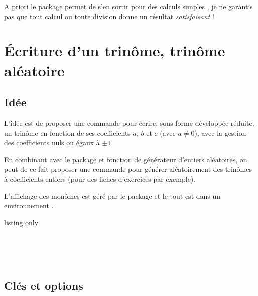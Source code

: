 \begin{noteblock}
A priori le package  permet de s'en sortir pour des calculs \og simples \fg, je ne garantis pas que tout calcul ou toute division donne un résultat \textit{satisfaisant} !
\end{noteblock}

\newpage

\section{Écriture d'un trinôme, trinôme aléatoire}\label{trinome}

\subsection{Idée}

\begin{tipblock}
L'idée est de proposer une commande pour écrire, sous forme développée réduite, un trinôme en fonction de ses coefficients $a$, $b$ et $c$ (avec $a\neq0$), avec la gestion des coefficients nuls ou égaux à $\pm1$.

\smallskip

En combinant avec le package  et fonction de générateur d'entiers aléatoires, on peut de ce fait proposer une commande pour générer aléatoirement des trinômes à coefficients entiers (pour des fiches d'exercices par exemple).

\smallskip

L'affichage des monômes est géré par le package  et le tout est dans un environnement .
\end{tipblock}

\begin{PresCodeTexPL}{listing only}
\end{PresCodeTexPL}

\begin{PresCodePL}{}
\\
\\
\\
\end{PresCodePL}

\subsection{Clés et options}

